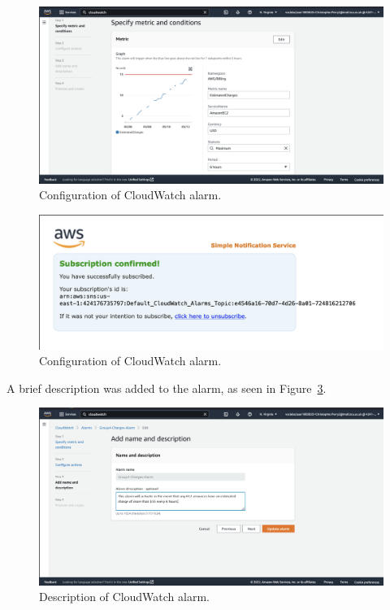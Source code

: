 \begin{figure}[!htbp]
    \centering
    \includegraphics[width=\textwidth]{resources/cloudwatch/cloudwatch-charges-config-1}
    \caption{Configuration of CloudWatch alarm.}
    \label{fig:cloudwatch-charges-config-1}
\end{figure}

\begin{figure}[!htbp]
    \centering
    \includegraphics[width=\textwidth]{resources/cloudwatch/cloudwatch-alarm-success}
    \caption{Configuration of CloudWatch alarm.}
    \label{fig:cloudwatch-charges-config-2}
\end{figure}

A brief description was added to the alarm, as seen in Figure~\ref{fig:cloudwatch-charges-description}.

\begin{figure}[!htbp]
    \centering
    \includegraphics[width=\textwidth]{resources/cloudwatch/cloudwatch-charges-description}
    \caption{Description of CloudWatch alarm.}
    \label{fig:cloudwatch-charges-description}
\end{figure}











